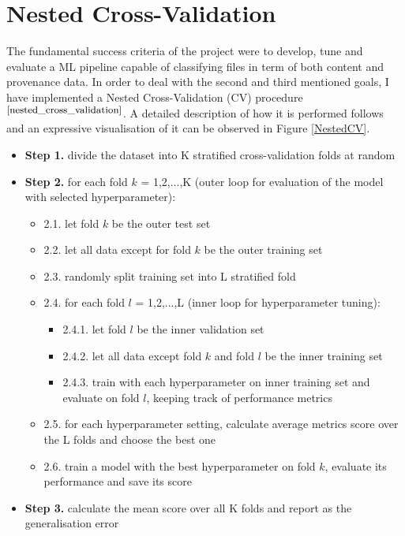 \section{Nested Cross-Validation} \label{nested_cross_validation}

The fundamental success criteria of the project were to develop, tune and evaluate a ML pipeline capable of classifying files in term of both content and provenance data. In order to deal with the second and third mentioned goals, I have implemented a Nested Cross-Validation (CV) procedure$^{\small \cite{nested_cross_validation}}$. A detailed description of how it is performed follows and an expressive visualisation of it can be observed in Figure \ref{NestedCV}. 

\begin{itemize}[label={}]
  \item \textbf{Step 1.} divide the dataset into K stratified cross-validation folds at random
  \item \textbf{Step 2.} for each fold $k$ = 1,2,...,K (outer loop for evaluation of the model with selected hyperparameter):
        \begin{itemize}[label={}]
          \item 2.1. let fold $k$ be the outer test set
          \item 2.2. let all data except for fold $k$ be the outer training set
          \item 2.3. randomly split training set into L stratified fold
          \item 2.4. for each fold $l$ = 1,2,...,L (inner loop for hyperparameter tuning):
                \begin{itemize}[label={}]
                  \item 2.4.1. let fold $l$ be the inner validation set
                  \item 2.4.2. let all data except fold $k$ and fold $l$ be the inner training set
                  \item 2.4.3. train with each hyperparameter on inner training set and evaluate on fold $l$, keeping track of performance metrics
                \end{itemize}
          \item 2.5. for each hyperparameter setting, calculate average metrics score over the L folds and choose the best one
          \item 2.6. train a model with the best hyperparameter on fold $k$, evaluate its performance and save its score
        \end{itemize}
  \item \textbf{Step 3.} calculate the mean score over all K folds and report as the generalisation error
\end{itemize} 

